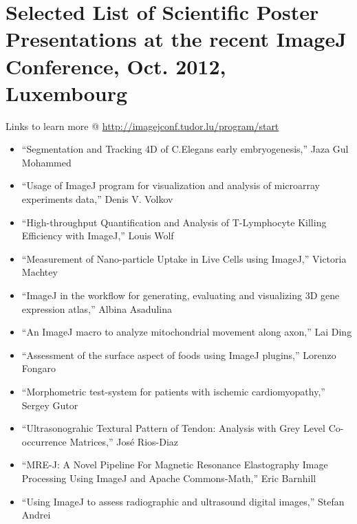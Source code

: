 \section*{Selected List of Scientific Poster Presentations at the recent ImageJ Conference, Oct. 2012, Luxembourg}
Links to learn more @ \url{http://imagejconf.tudor.lu/program/start}
\begin{itemize}
\item ``Segmentation and Tracking 4D of C.Elegans early embryogenesis,'' Jaza Gul Mohammed
\item ``Usage of ImageJ program for visualization and analysis of microarray experiments data,'' Denis V. Volkov
\item ``High-throughput Quantification and Analysis of T-Lymphocyte Killing Efficiency with ImageJ,'' Louis Wolf
\item ``Measurement of Nano-particle Uptake in Live Cells using ImageJ,'' Victoria Machtey
\item ``ImageJ in the workflow for generating, evaluating and visualizing 3D gene expression atlas,'' Albina Asadulina
\item ``An ImageJ macro to analyze mitochondrial movement along axon,'' Lai Ding
\item ``Assessment of the surface aspect of foods using ImageJ plugins,'' Lorenzo Fongaro
\item ``Morphometric test-system for patients with ischemic cardiomyopathy,'' Sergey Gutor
\item ``Ultrasonograhic Textural Pattern of Tendon: Analysis with Grey Level Co-occurrence Matrices,'' José Rios-Diaz
\item ``MRE-J: A Novel Pipeline For Magnetic Resonance Elastography Image Processing Using ImageJ and Apache Commons-Math,'' Eric Barnhill
\item ``Using ImageJ to assess radiographic and ultrasound digital images,'' Stefan Andrei
\end{itemize}
